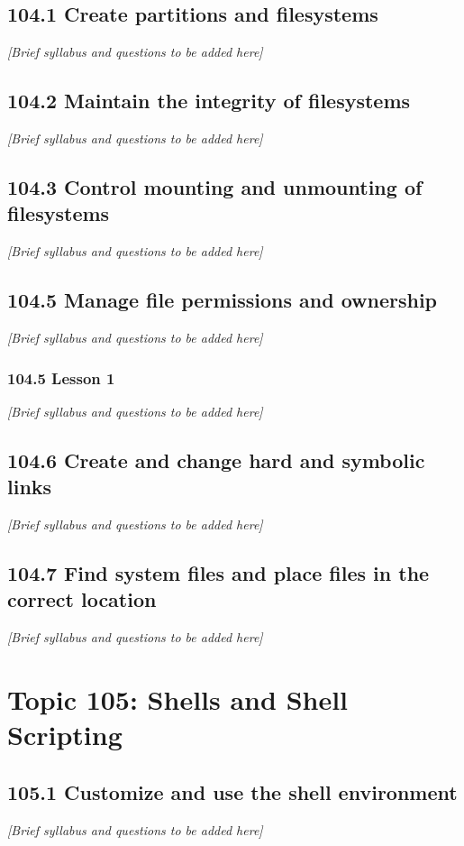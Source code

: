 \documentclass[a4paper]{report}
\begin{document}
\section{104.1 Create partitions and filesystems}
\textit{[Brief syllabus and questions to be added here]}

\section{104.2 Maintain the integrity of filesystems}
\textit{[Brief syllabus and questions to be added here]}

\section{104.3 Control mounting and unmounting of filesystems}
\textit{[Brief syllabus and questions to be added here]}

\section{104.5 Manage file permissions and ownership}
\textit{[Brief syllabus and questions to be added here]}

\subsection*{104.5 Lesson 1}
\textit{[Brief syllabus and questions to be added here]}

\section{104.6 Create and change hard and symbolic links}
\textit{[Brief syllabus and questions to be added here]}

\section{104.7 Find system files and place files in the correct location}
\textit{[Brief syllabus and questions to be added here]}

\chapter{Topic 105: Shells and Shell Scripting}
\section{105.1 Customize and use the shell environment}
\textit{[Brief syllabus and questions to be added here]}
\end{document}
